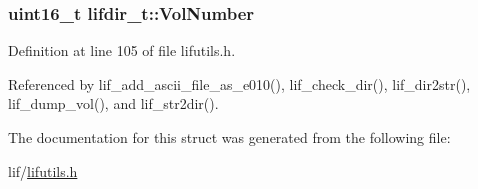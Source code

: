 \subsubsection[{\texorpdfstring{Vol\+Number}{VolNumber}}]{\setlength{\rightskip}{0pt plus 5cm}uint16\+\_\+t lifdir\+\_\+t\+::\+Vol\+Number}\hypertarget{structlifdir__t_a30c6a4231c58d2d43dc31e06bda5a687}{}\label{structlifdir__t_a30c6a4231c58d2d43dc31e06bda5a687}


Definition at line 105 of file lifutils.\+h.



Referenced by lif\+\_\+add\+\_\+ascii\+\_\+file\+\_\+as\+\_\+e010(), lif\+\_\+check\+\_\+dir(), lif\+\_\+dir2str(), lif\+\_\+dump\+\_\+vol(), and lif\+\_\+str2dir().



The documentation for this struct was generated from the following file\+:\begin{DoxyCompactItemize}
\item 
lif/\hyperlink{lifutils_8h}{lifutils.\+h}\end{DoxyCompactItemize}
